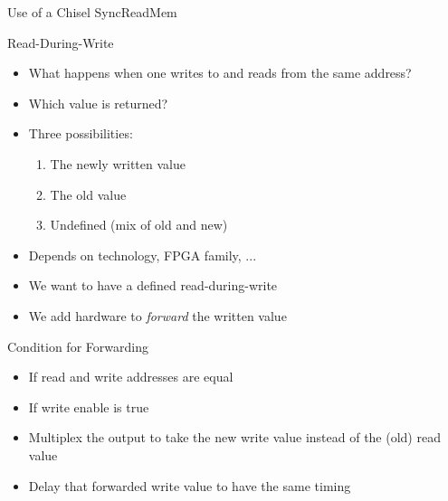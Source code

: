 \begin{frame}[fragile]{Use of a Chisel SyncReadMem}
\end{frame}

\begin{frame}[fragile]{Read-During-Write}
\begin{itemize}
\item What happens when one writes to and reads from the same address?
\item Which value is returned?
\item Three possibilities:
\begin{enumerate}
\item The newly written value
\item The old value
\item Undefined (mix of old and new)
\end{enumerate}
\item Depends on technology, FPGA family, ...
\item We want to have a defined read-during-write
\item We add hardware to \emph{forward} the written value
\end{itemize}
\end{frame}

\begin{frame}[fragile]{Condition for Forwarding}
\begin{itemize}
\item If read and write addresses are equal
\item If write enable is true
\item Multiplex the output to take the new write value instead of the (old) read value
\item Delay that forwarded write value to have the same timing
\end{itemize}
\end{frame}

